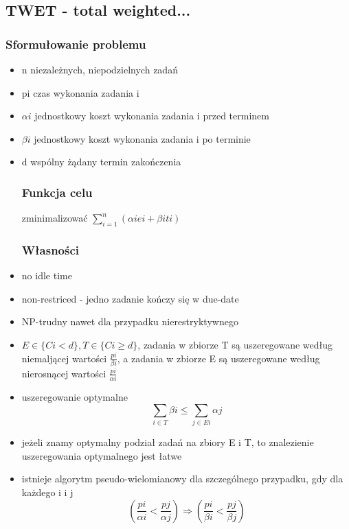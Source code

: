 \documentclass[12pt,a4paper]{article}
\begin{document}
\subsection{TWET - total weighted...}
\subsubsection{Sformułowanie problemu}
\begin{itemize}
\item n niezależnych, niepodzielnych zadań
\item pi czas wykonania zadania i
\item $\alpha i$ jednostkowy koszt wykonania zadania i przed terminem
\item $\beta i$ jednostkowy koszt wykonania zadania i po terminie
\item d wspólny żądany termin zakończenia

\subsubsection{Funkcja celu}
zminimalizować $\sum\limits_{i=1}^{n}(\alpha i ei + \beta iti)$
\subsubsection{Własności}
\item no idle time
\item non-restriced - jedno zadanie kończy się w due-date
\item NP-trudny nawet dla przypadku nierestryktywnego
\item $E \in \{ Ci<d \}, T \in\{Ci\geq d\}$, zadania w zbiorze T są uszeregowane według niemaljącej wartości $\frac{pi}{\beta i}$, a zadania w zbiorze E są uszeregowane według nierosnącej wartości $\frac{pi}{\alpha i}$
\item uszeregowanie optymalne \begin{equation}
\sum\limits_{i\in T} \beta i \leq \sum\limits_{j \in Ei} \alpha j
\end{equation}
\item jeżeli znamy optymalny podział zadań na zbiory E i T, to znalezienie uszeregowania optymalnego jest łatwe
\item istnieje algorytm pseudo-wielomianowy dla szczególnego przypadku, gdy dla każdego i i j \begin{equation}
(\frac{pi}{\alpha i} < \frac{pj}{\alpha j}) \Rightarrow (\frac{pi}{\beta i} < \frac{pj}{\beta j})
\end{equation}
\end{itemize}
\end{document}
